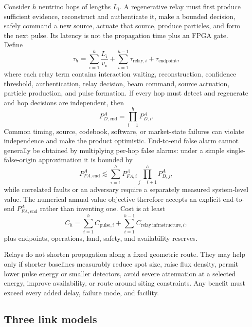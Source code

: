 \documentclass[11pt]{article}
\begin{document}
Consider $h$ neutrino hops of lengths $L_i$. A regenerative relay must first produce sufficient evidence, reconstruct and authenticate it, make a bounded decision, safely command a new source, actuate that source, produce particles, and form the next pulse. Its latency is not the propagation time plus an FPGA gate. Define
\begin{equation}
\tau_h=\sum_{i=1}^{h}\frac{L_i}{v_\nu}
+\sum_{i=1}^{h-1}\tau_{\mathrm{relay},i}
+\tau_{\mathrm{endpoint}},
\label{eq:relay-latency}
\end{equation}
where each relay term contains interaction waiting, reconstruction, confidence threshold, authentication, relay decision, beam command, source actuation, particle production, and pulse formation. If every hop must detect and regenerate and hop decisions are independent, then
\begin{equation}
P_{D,\mathrm{end}}^{A}=\prod_{i=1}^{h}P_{D,i}^{A}.
\label{eq:relay-reliability}
\end{equation}
Common timing, source, codebook, software, or market-state failures can violate independence and make the product optimistic. End-to-end false alarm cannot generally be obtained by multiplying per-hop false alarms: under a simple single-false-origin approximation it is bounded by
\begin{equation}
P_{FA,\mathrm{end}}^{A}\lesssim\sum_{i=1}^{h}P_{FA,i}^{A}
\prod_{j=i+1}^{h}P_{D,j}^{A},
\label{eq:relay-pfa}
\end{equation}
while correlated faults or an adversary require a separately measured system-level value. The numerical annual-value objective therefore accepts an explicit end-to-end $P_{FA,\mathrm{end}}^{A}$ rather than inventing one. Cost is at least
\begin{equation}
C_h=\sum_{i=1}^{h}C_{\mathrm{pulse},i}
+\sum_{i=1}^{h-1}C_{\mathrm{relay\ infrastructure},i},
\end{equation}
plus endpoints, operations, land, safety, and availability reserves.

Relays do not shorten propagation along a fixed geometric route. They may help only if shorter baselines measurably reduce spot size, raise flux density, permit lower pulse energy or smaller detectors, avoid severe attenuation at a selected energy, improve availability, or route around siting constraints. Any benefit must exceed every added delay, failure mode, and facility.

\subsection{Three link models}
\end{document}

